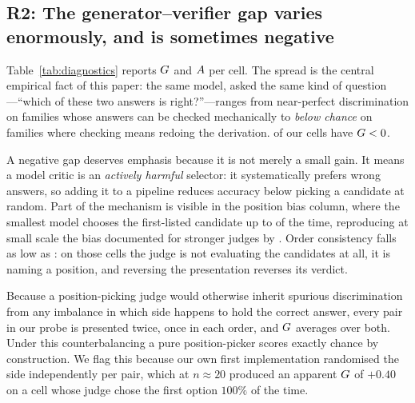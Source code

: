 \subsection{R2: The generator--verifier gap varies enormously, and is sometimes negative}

\begin{table}[t]
\centering\small
\caption{The two cheap diagnostics measured on the \nCalib{}-task calibration
split, with judge position bias (the rate at which the first-listed candidate
is chosen; $0.5$ is unbiased) and order consistency (how often the judge names
the same candidate when the two are presented in the opposite order; a judge
that simply picks a position scores $0$). $\gap$ ranges from \Gmin{} to \Gmax{};
\nGnegative{} cells are negative, meaning the model prefers its own incorrect
answers more often than its correct ones.}
\label{tab:diagnostics}

\end{table}

Table~\ref{tab:diagnostics} reports $\gap$ and $A$ per cell. The spread is
the central empirical fact of this paper: the same model, asked the same kind
of question---``which of these two answers is right?''---ranges from near-perfect
discrimination on families whose answers can be checked mechanically to
\emph{below chance} on families where checking means redoing the derivation.
\nGnegative{} of our cells have $G < 0$.

A negative gap deserves emphasis because it is not merely a small gain. It
means a model critic is an \emph{actively harmful} selector: it systematically
prefers wrong answers, so adding it to a pipeline reduces accuracy below
picking a candidate at random. Part of the mechanism is visible in the position
bias column, where the smallest model chooses the first-listed candidate up to
\maxPositionBias{} of the time, reproducing at small scale the bias documented
for stronger judges by \citet{zheng2023judge}. Order consistency falls as low
as \minOrderConsistency{}: on those cells the judge is not evaluating the
candidates at all, it is naming a position, and reversing the presentation
reverses its verdict.

Because a position-picking judge would otherwise inherit spurious
discrimination from any imbalance in which side happens to hold the correct
answer, every pair in our probe is presented twice, once in each order, and
$\gap$ averages over both. Under this counterbalancing a pure position-picker
scores exactly chance by construction. We flag this because our own first
implementation randomised the side independently per pair, which at
$n\approx20$ produced an apparent $\gap$ of $+0.40$ on a cell whose judge chose
the first option $100\%$ of the time.


